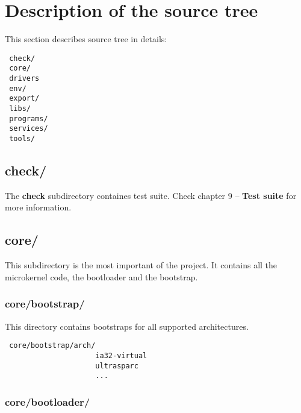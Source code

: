 
%
%

\chapter{Description of the source tree}

\newpage

This section describes \kaneton source tree in details:

\begin{verbatim}
 check/
 core/
 drivers
 env/
 export/
 libs/
 programs/
 services/
 tools/
\end{verbatim}

\section{check/}

The \textbf{check}  subdirectory containes \kaneton  test suite. Check
chapter 9 -- \textbf{Test suite} for more information.

\section{core/}

This subdirectory is the most important of the project. It contains
all the microkernel code, the bootloader and the bootstrap.

\subsection*{core/bootstrap/}

This directory contains bootstraps for all supported architectures.

\begin{verbatim}
 core/bootstrap/arch/
                     ia32-virtual
                     ultrasparc
                     ...
\end{verbatim}

\subsection*{core/bootloader/}

